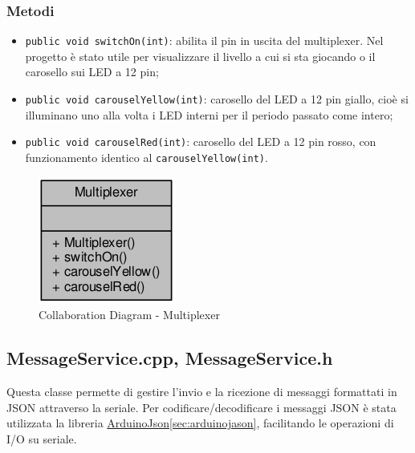 \subsubsection{Metodi}
\begin{itemize}
	\item \texttt{public void switchOn(int)}: abilita il pin in uscita del multiplexer. Nel progetto è stato utile per visualizzare il livello a cui si sta giocando o il carosello sui LED a 12 pin;
	\item \texttt{public void carouselYellow(int)}: carosello del LED a 12 pin giallo, cioè si illuminano uno alla volta i LED interni per il periodo passato come intero;
	\item \texttt{public void carouselRed(int)}: carosello del LED a 12 pin rosso, con funzionamento identico al \texttt{carouselYellow(int)}.
\end{itemize}
\begin{figure}[!ht]
	\centering
	\includegraphics[scale=.5]{img/UML/CollaborationDiagram/Multiplexer.png}
	\caption{Collaboration Diagram - Multiplexer}
\end{figure}

\newpage
\subsection{MessageService.cpp, MessageService.h}
Questa classe permette di gestire l'invio e la ricezione di messaggi formattati in JSON attraverso la seriale.
Per codificare/decodificare i messaggi JSON è stata utilizzata la libreria \href{https://github.com/bblanchon/ArduinoJson}{ArduinoJson}\ref{sec:arduinojason}, facilitando le operazioni di I/O su seriale.
